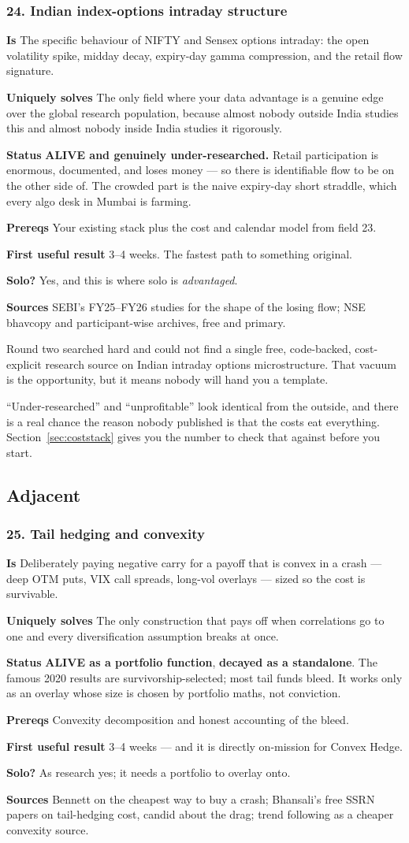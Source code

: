 \documentclass[11pt,a4paper]{article}
\newcommand{\alv}[1]{\textcolor{alive}{\textbf{#1}}}
\newcommand{\dec}[1]{\textcolor{decayed}{\textbf{#1}}}
\newcommand{\fitem}[1]{\par\smallskip\noindent\textbf{#1} }
\newcommand{\srcnote}[1]{{\footnotesize\color{soft}#1\par}}
\begin{document}
\subsubsection{24. Indian index-options intraday structure}
\fitem{Is}The specific behaviour of NIFTY and Sensex options intraday: the open
volatility spike, midday decay, expiry-day gamma compression, and the retail flow
signature.
\fitem{Uniquely solves}The only field where your data advantage is a genuine edge
over the global research population, because almost nobody outside India studies
this and almost nobody inside India studies it rigorously.
\fitem{Status}\alv{ALIVE and genuinely under-researched.} Retail participation is
enormous, documented, and loses money --- so there is identifiable flow to be on
the other side of. The crowded part is the naive expiry-day short straddle, which
every algo desk in Mumbai is farming.
\fitem{Prereqs}Your existing stack plus the cost and calendar model from field 23.
\fitem{First useful result}3--4 weeks. The fastest path to something original.
\fitem{Solo?}Yes, and this is where solo is \emph{advantaged}.
\fitem{Sources}SEBI's FY25--FY26 studies for the shape of the losing flow; NSE
bhavcopy and participant-wise archives, free and primary.
\srcnote{Round two searched hard and could not find a single free, code-backed,
cost-explicit research source on Indian intraday options microstructure. That
vacuum is the opportunity, but it means nobody will hand you a template.}

\begin{waste}
``Under-researched'' and ``unprofitable'' look identical from the outside, and
there is a real chance the reason nobody published is that the costs eat
everything. Section~\ref{sec:coststack} gives you the number to check that
against before you start.
\end{waste}

\subsection{Adjacent}

\subsubsection{25. Tail hedging and convexity}
\fitem{Is}Deliberately paying negative carry for a payoff that is convex in a
crash --- deep OTM puts, VIX call spreads, long-vol overlays --- sized so the
cost is survivable.
\fitem{Uniquely solves}The only construction that pays off when correlations go
to one and every diversification assumption breaks at once.
\fitem{Status}\alv{ALIVE as a portfolio function}, \dec{decayed as a standalone}.
The famous 2020 results are survivorship-selected; most tail funds bleed. It works
only as an overlay whose size is chosen by portfolio maths, not conviction.
\fitem{Prereqs}Convexity decomposition and honest accounting of the bleed.
\fitem{First useful result}3--4 weeks --- and it is directly on-mission for
Convex Hedge.
\fitem{Solo?}As research yes; it needs a portfolio to overlay onto.
\fitem{Sources}Bennett on the cheapest way to buy a crash; Bhansali's free SSRN
papers on tail-hedging cost, candid about the drag; trend following as a cheaper
convexity source.
\end{document}
